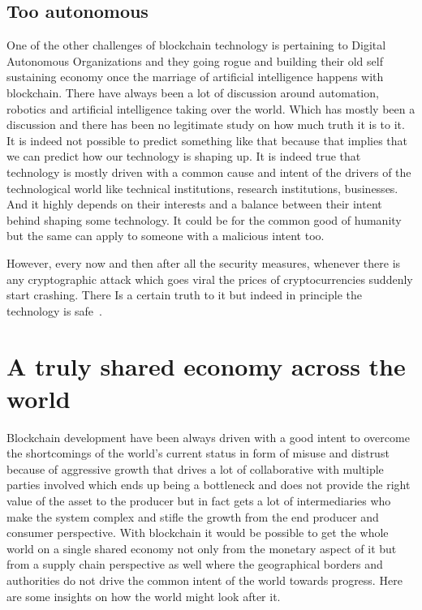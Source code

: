 \subsection{Too autonomous}

One of the other challenges of blockchain technology is pertaining to
Digital Autonomous Organizations and they going rogue and building
their old self sustaining economy once the marriage of artificial
intelligence happens with blockchain. There have always been a lot of
discussion around automation, robotics and artificial intelligence
taking over the world. Which has mostly been a discussion and there
has been no legitimate study on how much truth it is to it. It is
indeed not possible to predict something like that because that
implies that we can predict how our technology is shaping up. It is
indeed true that technology is mostly driven with a common cause and
intent of the drivers of the technological world like technical
institutions, research institutions, businesses. And it highly depends
on their interests and a balance between their intent behind shaping
some technology. It could be for the common good of humanity but the
same can apply to someone with a malicious intent too.


However, every now and then after all the security measures, whenever
there is any cryptographic attack which goes viral the prices of
cryptocurrencies suddenly start crashing. There Is a certain truth to
it but indeed in principle the technology is safe~\cite{david36}.

\section{A truly shared economy across the world}

Blockchain development have been always driven with a good intent to
overcome the shortcomings of the world's current status in form of
misuse and distrust because of aggressive growth that drives a lot of
collaborative with multiple parties involved which ends up being a
bottleneck and does not provide the right value of the asset to the
producer but in fact gets a lot of intermediaries who make the system
complex and stifle the growth from the end producer and consumer
perspective. With blockchain it would be possible to get the whole
world on a single shared economy not only from the monetary aspect of
it but from a supply chain perspective as well where the geographical
borders and authorities do not drive the common intent of the world
towards progress. Here are some insights on how the world might look
after it.

